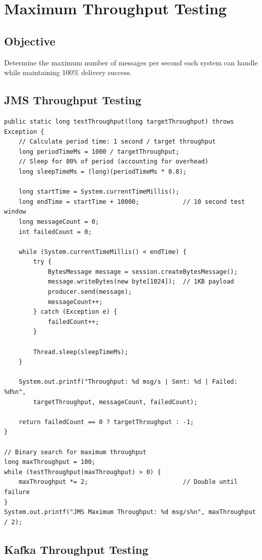 \documentclass[11pt,a4paper]{article}
\begin{document}
\newpage
\section{Maximum Throughput Testing}

\subsection{Objective}
Determine the maximum number of messages per second each system can handle while
maintaining 100\% delivery success.

\subsection{JMS Throughput Testing}

\begin{lstlisting}[style=javastyle, caption=JMS Throughput Testing Implementation]
public static long testThroughput(long targetThroughput) throws Exception {
    // Calculate period time: 1 second / target throughput
    long periodTimeMs = 1000 / targetThroughput;
    // Sleep for 80% of period (accounting for overhead)
    long sleepTimeMs = (long)(periodTimeMs * 0.8);
    
    long startTime = System.currentTimeMillis();
    long endTime = startTime + 10000;            // 10 second test window
    long messageCount = 0;
    int failedCount = 0;
    
    while (System.currentTimeMillis() < endTime) {
        try {
            BytesMessage message = session.createBytesMessage();
            message.writeBytes(new byte[1024]);  // 1KB payload
            producer.send(message);
            messageCount++;
        } catch (Exception e) {
            failedCount++;
        }
        
        Thread.sleep(sleepTimeMs);
    }
    
    System.out.printf("Throughput: %d msg/s | Sent: %d | Failed: %d%n", 
        targetThroughput, messageCount, failedCount);
    
    return failedCount == 0 ? targetThroughput : -1;
}

// Binary search for maximum throughput
long maxThroughput = 100;
while (testThroughput(maxThroughput) > 0) {
    maxThroughput *= 2;                          // Double until failure
}
System.out.printf("JMS Maximum Throughput: %d msg/s%n", maxThroughput / 2);
\end{lstlisting}

\subsection{Kafka Throughput Testing}
\end{document}
